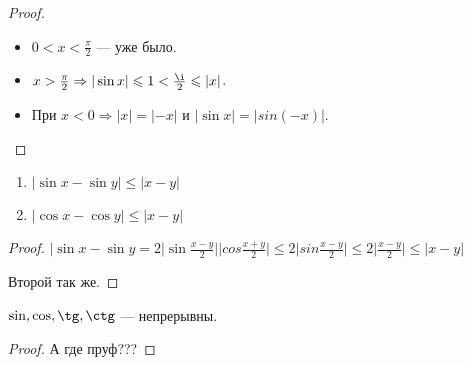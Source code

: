 \begin{proof}
\slashn
    \begin{itemize}
        \item $0 < x < \frac{\pi}{2}$ --- уже было.
        \item $x > \frac{\pi}{2} \Rightarrow |\sin x| \le 1 < \frac{\i}{2} \le |x|$.
        \item При $x < 0 \Rightarrow |x| = |-x|$ и  $|\sin x| = |sin(-x)|$.
    \end{itemize}
\end{proof}
\begin{consequence}
\slashn
\begin{enumerate}
    \item $|\sin x - \sin y| \le |x-y|$
    \item $|\cos x - \cos y| \le |x-y|$
\end{enumerate}
\end{consequence}
\begin{proof}
    $|\sin x - \sin y = 2|\sin \frac{x-y}{2}||cos \frac{x+y}{2}| \le 2 |sin \frac{x-y}{2}| \le 2 |\frac{x-y}{2}| \le |x-y|$ 

    Второй так же.
\end{proof}
\begin{theorem}
    $\sin, \cos, \tg, \ctg$ --- непрерывны.
\end{theorem}
\begin{proof}
    А где пруф???
\end{proof}

